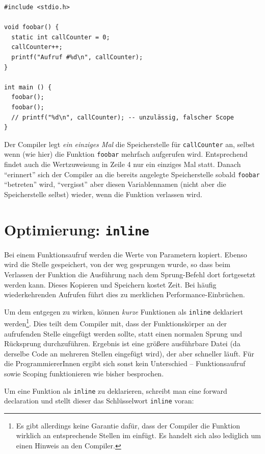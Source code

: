 \begin{codebox}
\begin{verbatim}
#include <stdio.h>

void foobar() {
  static int callCounter = 0;
  callCounter++;
  printf("Aufruf #%d\n", callCounter);
}

int main () {
  foobar();
  foobar();
  // printf("%d\n", callCounter); -- unzulässig, falscher Scope
}
\end{verbatim}
\end{codebox}

Der Compiler legt \emph{ein einziges Mal} die Speicherstelle für \texttt{callCounter} an, selbst wenn (wie hier) die Funktion \texttt{foobar} mehrfach aufgerufen wird. Entsprechend findet auch die Wertzuweisung in Zeile 4 nur ein einziges Mal statt. Danach \enquote{erinnert} sich der Compiler an die bereits angelegte Speicherstelle sobald \texttt{foobar} \enquote{betreten} wird, \enquote{vergisst} aber diesen Variablennamen (nicht aber die Speicherstelle selbst) wieder, wenn die Funktion verlassen wird.

\section{Optimierung: \texttt{inline}} \label{sec:inline}
Bei einem Funktionsaufruf werden die Werte von Parametern kopiert.  Ebenso wird die Stelle gespeichert, von der weg gesprungen wurde, so dass beim Verlassen der Funktion die Ausführung nach dem Sprung-Befehl dort fortgesetzt werden kann. Dieses Kopieren und Speichern kostet Zeit. Bei häufig wiederkehrenden Aufrufen führt dies zu merklichen Performance-Einbrüchen.

Um dem entgegen zu wirken, können \emph{kurze} Funktionen als \texttt{inline} deklariert werden\footnote{Es gibt allerdings keine Garantie dafür, dass der Compiler die Funktion wirklich an entsprechende Stellen im einfügt. Es handelt sich also lediglich um einen Hinweis an den Compiler.}. Dies teilt dem Compiler mit, dass der Funktionskörper an der aufrufenden Stelle eingefügt werden sollte, statt einen normalen Sprung und Rücksprung durchzuführen. Ergebnis ist eine größere ausführbare Datei (da derselbe Code an mehreren Stellen eingefügt wird), der aber schneller läuft. Für die ProgrammiererInnen ergibt sich sonst kein Unterschied -- Funktionsaufruf sowie Scoping funktionieren wie bisher besprochen.

Um eine Funktion als \texttt{inline} zu deklarieren, schreibt man eine forward declaration und stellt dieser das Schlüsselwort \texttt{inline} voran:

